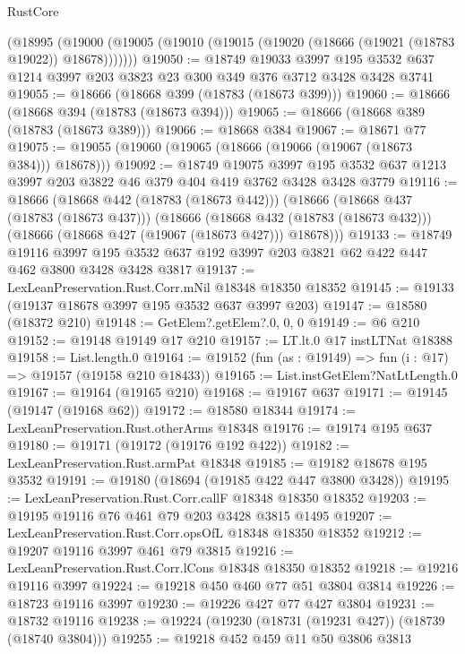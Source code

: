 \begin{lexlean}{RustCore}
\begin{coremodule}
    (@18995 (@19000 (@19005 (@19010 (@19015 (@19020 (@18666 (@19021 (@18783 @19022)) @18678)))))))
@19050 := @18749
    @19033
    @3997
    @195
    @3532
    @637
    @1214
    @3997
    @203
    @3823
    @23
    @300
    @349
    @376
    @3712
    @3428
    @3428
    @3741
@19055 := @18666 (@18668 @399 (@18783 (@18673 @399)))
@19060 := @18666 (@18668 @394 (@18783 (@18673 @394)))
@19065 := @18666 (@18668 @389 (@18783 (@18673 @389)))
@19066 := @18668 @384
@19067 := @18671 @77
@19075 := @19055 (@19060 (@19065 (@18666 (@19066 (@19067 (@18673 @384))) @18678)))
@19092 := @18749
    @19075
    @3997
    @195
    @3532
    @637
    @1213
    @3997
    @203
    @3822
    @46
    @379
    @404
    @419
    @3762
    @3428
    @3428
    @3779
@19116 := @18666
    (@18668 @442 (@18783 (@18673 @442)))
    (@18666
      (@18668 @437 (@18783 (@18673 @437)))
      (@18666
        (@18668 @432 (@18783 (@18673 @432)))
        (@18666 (@18668 @427 (@19067 (@18673 @427))) @18678)))
@19133 := @18749
    @19116
    @3997
    @195
    @3532
    @637
    @192
    @3997
    @203
    @3821
    @62
    @422
    @447
    @462
    @3800
    @3428
    @3428
    @3817
@19137 := LexLeanPreservation.Rust.Corr.mNil @18348 @18350 @18352
@19145 := @19133 (@19137 @18678 @3997 @195 @3532 @637 @3997 @203)
@19147 := @18580 (@18372 @210)
@19148 := GetElem?.getElem?.{0, 0, 0}
@19149 := @6 @210
@19152 := @19148 @19149 @17 @210
@19157 := LT.lt.{0} @17 instLTNat @18388
@19158 := List.length.{0}
@19164 := @19152 (fun (as : @19149) => fun (i : @17) => @19157 (@19158 @210 @18433))
@19165 := List.instGetElem?NatLtLength.{0}
@19167 := @19164 (@19165 @210)
@19168 := @19167 @637
@19171 := @19145 (@19147 (@19168 @62))
@19172 := @18580 @18344
@19174 := LexLeanPreservation.Rust.otherArms @18348
@19176 := @19174 @195 @637
@19180 := @19171 (@19172 (@19176 @192 @422))
@19182 := LexLeanPreservation.Rust.armPat @18348
@19185 := @19182 @18678 @195 @3532
@19191 := @19180 (@18694 (@19185 @422 @447 @3800 @3428))
@19195 := LexLeanPreservation.Rust.Corr.callF @18348 @18350 @18352
@19203 := @19195 @19116 @76 @461 @79 @203 @3428 @3815 @1495
@19207 := LexLeanPreservation.Rust.Corr.opsOfL @18348 @18350 @18352
@19212 := @19207 @19116 @3997 @461 @79 @3815
@19216 := LexLeanPreservation.Rust.Corr.lCons @18348 @18350 @18352
@19218 := @19216 @19116 @3997
@19224 := @19218 @450 @460 @77 @51 @3804 @3814
@19226 := @18723 @19116 @3997
@19230 := @19226 @427 @77 @427 @3804
@19231 := @18732 @19116
@19238 := @19224 (@19230 (@18731 (@19231 @427)) (@18739 (@18740 @3804)))
@19255 := @19218
    @452
    @459
    @11
    @50
    @3806
    @3813

\end{coremodule}
\end{lexlean}
